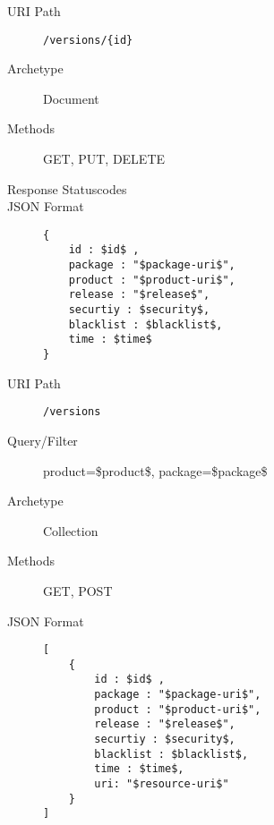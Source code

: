 \documentclass[10pt,a4paper]{scrartcl}
\begin{document}
\begin{mdframed}[style=def]
\begin{description}
	\item[URI Path] \texttt{/versions/\{id\}}
	\item[Archetype] Document
	\item[Methods] GET, PUT, DELETE
	\item[Response Statuscodes] \hfill
	\item[JSON Format] \hfill
\begin{lstlisting}
{
	id : $id$ ,
	package : "$package-uri$",
	product : "$product-uri$",
	release : "$release$",
	securtiy : $security$,
	blacklist : $blacklist$,
	time : $time$
}
\end{lstlisting}
\end{description}
\end{mdframed}

\begin{mdframed}[style=def]
\begin{description}
	\item[URI Path] \texttt{/versions}
	\item[Query/Filter]	product=\$product\$, package=\$package\$ 
	\item[Archetype] Collection
	\item[Methods] GET, POST
	\item[JSON Format] \hfill
\begin{lstlisting}
[
	{
	    id : $id$ ,
	    package : "$package-uri$",
	    product : "$product-uri$",
    	release : "$release$",
    	securtiy : $security$,
    	blacklist : $blacklist$,
    	time : $time$,
    	uri: "$resource-uri$"
    }
]
\end{lstlisting}
\end{description}
\end{mdframed}
\end{document}

